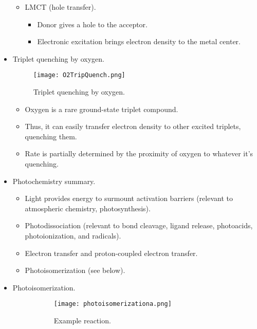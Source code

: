 \documentclass[../notes.tex]{subfiles}
\begin{document}
\begin{itemize}
\begin{itemize}
        \item LMCT (hole transfer).
        \begin{itemize}
            \item Donor gives a hole to the acceptor.
            \item Electronic excitation brings electron density to the metal center.
        \end{itemize}
    \end{itemize}
    \item Triplet quenching by oxygen.
    \begin{figure}[h!]
        \centering
        \texttt{[image: O2TripQuench.png]}
        \caption{Triplet quenching by oxygen.}
        \label{fig:O2TripQuench}
    \end{figure}
    \begin{itemize}
        \item Oxygen is a rare ground-state triplet compound.
        \item Thus, it can easily transfer electron density to other excited triplets, quenching them.
        \item Rate is partially determined by the proximity of oxygen to whatever it's quenching.
    \end{itemize}
    \item Photochemistry summary.
    \begin{itemize}
        \item Light provides energy to surmount activation barriers (relevant to atmospheric chemistry, photosynthesis).
        \item Photodissociation (relevant to bond cleavage, ligand release, photoacids, photoionization, and radicals).
        \item Electron transfer and proton-coupled electron transfer.
        \item Photoisomerization (see below).
    \end{itemize}
    \item Photoisomerization.
    \begin{figure}[h!]
        \centering
        \begin{subfigure}[b]{0.5\linewidth}
            \centering
            \texttt{[image: photoisomerizationa.png]}
            \caption{Example reaction.}
            \label{fig:photoisomerizationa}
        \end{subfigure}
        \begin{subfigure}[b]{0.3\linewidth}

\end{subfigure}
\end{figure}
\end{itemize}
\end{document}
